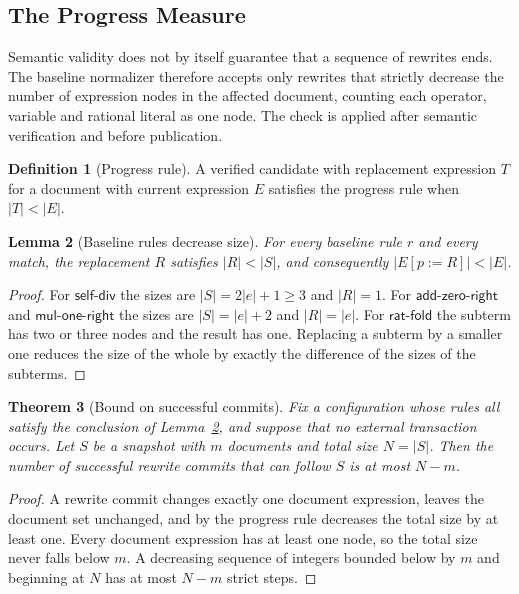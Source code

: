 \documentclass[11pt,a4paper]{article}
\theoremstyle{plain}
\newtheorem{theorem}{Theorem}[section]
\newtheorem{lemma}[theorem]{Lemma}
\theoremstyle{definition}
\newtheorem{definition}[theorem]{Definition}
\theoremstyle{remark}
\theoremstyle{definition}
\newcommand{\sz}[1]{\lvert #1\rvert}
\newcommand{\replace}[3]{#1[#2 \mathbin{:=} #3]}
\begin{document}
\subsection{The Progress Measure}

Semantic validity does not by itself guarantee that a sequence of rewrites ends. The baseline normalizer therefore accepts only rewrites that strictly decrease the number of expression nodes in the affected document, counting each operator, variable and rational literal as one node. The check is applied after semantic verification and before publication.

\begin{definition}[Progress rule]
A verified candidate with replacement expression $T$ for a document with current expression $E$ satisfies the progress rule when $\sz{T} < \sz{E}$.
\end{definition}

\begin{lemma}[Baseline rules decrease size]
\label{lem:decrease}
For every baseline rule $r$ and every match, the replacement $R$ satisfies $\sz{R} < \sz{S}$, and consequently $\sz{\replace{E}{p}{R}} < \sz{E}$.
\end{lemma}

\begin{proof}
For $\mathsf{self\text{-}div}$ the sizes are $\sz{S} = 2\sz{e} + 1 \ge 3$ and $\sz{R} = 1$. For $\mathsf{add\text{-}zero\text{-}right}$ and $\mathsf{mul\text{-}one\text{-}right}$ the sizes are $\sz{S} = \sz{e} + 2$ and $\sz{R} = \sz{e}$. For $\mathsf{rat\text{-}fold}$ the subterm has two or three nodes and the result has one. Replacing a subterm by a smaller one reduces the size of the whole by exactly the difference of the sizes of the subterms.
\end{proof}

\begin{theorem}[Bound on successful commits]
\label{thm:bound}
Fix a configuration whose rules all satisfy the conclusion of Lemma~\ref{lem:decrease}, and suppose that no external transaction occurs. Let $S$ be a snapshot with $m$ documents and total size $N = \sz{S}$. Then the number of successful rewrite commits that can follow $S$ is at most $N - m$.
\end{theorem}

\begin{proof}
A rewrite commit changes exactly one document expression, leaves the document set unchanged, and by the progress rule decreases the total size by at least one. Every document expression has at least one node, so the total size never falls below $m$. A decreasing sequence of integers bounded below by $m$ and beginning at $N$ has at most $N - m$ strict steps.
\end{proof}
\end{document}
